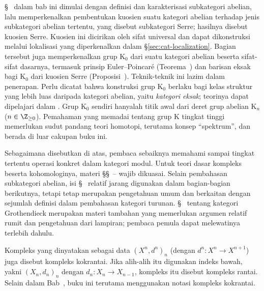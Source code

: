 \S~ dalam bab ini dimulai dengan
definisi dan karakterisasi subkategori abelian, lalu memperkenalkan pembentukan
kuosien suatu kategori abelian terhadap jenis subkategori abelian tertentu,
yang disebut subkategori Serre; hasilnya disebut kuosien Serre.
Kuosien ini dicirikan oleh sifat universal dan dapat dikonstruksi melalui
lokalisasi yang diperkenalkan dalam \S\ref{sec:cat-localization}. Bagian
tersebut juga memperkenalkan grup $\mathrm{K}_0$ dari suatu kategori abelian
beserta sifat-sifat dasarnya, termasuk prinsip Euler--Poincaré
(Teorema~) dan barisan eksak bagi
$\mathrm{K}_0$ dari kuosien Serre
(Proposisi~). Teknik-teknik ini
lazim dalam penerapan. Perlu dicatat bahwa konstruksi grup $\mathrm{K}_0$
berlaku bagi kelas struktur yang lebih luas daripada kategori abelian, yaitu
\emph{kategori eksak}; teorinya dapat dipelajari dalam \cite{Bu10}. Grup
$\mathrm{K}_0$ sendiri hanyalah titik awal dari deret grup abelian
$\mathrm{K}_n$ ($n\in\Z_{\geq 0}$). Pemahaman yang memadai tentang grup K
tingkat tinggi memerlukan sudut pandang teori homotopi, terutama konsep
``spektrum'', dan berada di luar cakupan buku ini.

\begin{petunjukbacaan}
	Sebagaimana disebutkan di atas, pembaca sebaiknya memahami sampai tingkat
	tertentu operasi konkret dalam kategori modul. Untuk teori dasar kompleks
	beserta kohomologinya, materi
	\S\S~--%
	 wajib dikuasai. Selain pembahasan
	subkategori abelian, isi \S~ relatif
	jarang digunakan dalam bagian-bagian berikutnya, tetapi tetap merupakan
	pengetahuan umum dan berkaitan dengan sejumlah definisi dalam pembahasan
	kategori turunan. \S~ tentang
	kategori Grothendieck merupakan materi tambahan yang memerlukan argumen
	relatif rumit dan pengetahuan dari lampiran; pembaca pemula dapat
	melewatinya terlebih dahulu.

	Kompleks yang dinyatakan sebagai data $(X^n,d^n)_n$ (dengan
	$d^n:X^n\to X^{n+1}$) juga disebut kompleks kokrantai. Jika alih-alih itu
	digunakan indeks bawah, yakni $(X_n,d_n)_n$ dengan
	$d_n:X_n\to X_{n-1}$, kompleks itu disebut kompleks rantai. Selain dalam
	Bab~, buku ini terutama menggunakan
	notasi kompleks kokrantai.
\end{petunjukbacaan}

